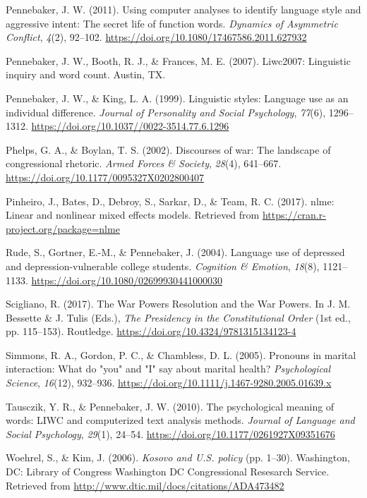 \documentclass[english,,man]{apa6}
\begin{document}
\leavevmode\hypertarget{ref-Pennebaker2011}{}%
Pennebaker, J. W. (2011). Using computer analyses to identify language style and aggressive intent: The secret life of function words. \emph{Dynamics of Asymmetric Conflict}, \emph{4}(2), 92--102. \url{https://doi.org/10.1080/17467586.2011.627932}

\leavevmode\hypertarget{ref-Pennebaker2007}{}%
Pennebaker, J. W., Booth, R. J., \& Frances, M. E. (2007). Liwc2007: Linguistic inquiry and word count. Austin, TX.

\leavevmode\hypertarget{ref-Pennebaker1999}{}%
Pennebaker, J. W., \& King, L. A. (1999). Linguistic styles: Language use as an individual difference. \emph{Journal of Personality and Social Psychology}, \emph{77}(6), 1296--1312. \url{https://doi.org/10.1037//0022-3514.77.6.1296}

\leavevmode\hypertarget{ref-Phelps2002}{}%
Phelps, G. A., \& Boylan, T. S. (2002). Discourses of war: The landscape of congressional rhetoric. \emph{Armed Forces \& Society}, \emph{28}(4), 641--667. \url{https://doi.org/10.1177/0095327X0202800407}

\leavevmode\hypertarget{ref-Pinheiro2017}{}%
Pinheiro, J., Bates, D., Debroy, S., Sarkar, D., \& Team, R. C. (2017). nlme: Linear and nonlinear mixed effects models. Retrieved from \url{https://cran.r-project.org/package=nlme}

\leavevmode\hypertarget{ref-Rude2004}{}%
Rude, S., Gortner, E.-M., \& Pennebaker, J. (2004). Language use of depressed and depression-vulnerable college students. \emph{Cognition \& Emotion}, \emph{18}(8), 1121--1133. \url{https://doi.org/10.1080/02699930441000030}

\leavevmode\hypertarget{ref-Bessette2017}{}%
Scigliano, R. (2017). The War Powers Resolution and the War Powers. In J. M. Bessette \& J. Tulis (Eds.), \emph{The Presidency in the Constitutional Order} (1st ed., pp. 115--153). Routledge. \url{https://doi.org/10.4324/9781315134123-4}

\leavevmode\hypertarget{ref-Simmons2005}{}%
Simmons, R. A., Gordon, P. C., \& Chambless, D. L. (2005). Pronouns in marital interaction: What do "you" and "I" say about marital health? \emph{Psychological Science}, \emph{16}(12), 932--936. \url{https://doi.org/10.1111/j.1467-9280.2005.01639.x}

\leavevmode\hypertarget{ref-Tausczik2010}{}%
Tausczik, Y. R., \& Pennebaker, J. W. (2010). The psychological meaning of words: LIWC and computerized text analysis methods. \emph{Journal of Language and Social Psychology}, \emph{29}(1), 24--54. \url{https://doi.org/10.1177/0261927X09351676}

\leavevmode\hypertarget{ref-Woehrel2006}{}%
Woehrel, S., \& Kim, J. (2006). \emph{Kosovo and U.S. policy} (pp. 1--30). Washington, DC: Library of Congress Washington DC Congressional Resesarch Service. Retrieved from \url{http://www.dtic.mil/docs/citations/ADA473482}
\end{document}
